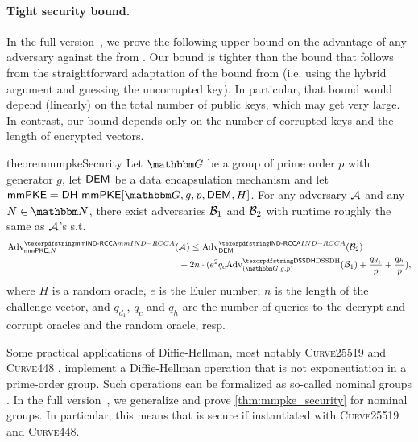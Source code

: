 \paragraph{Tight security bound.}
In the full version~\cite{EPRINT:AHKM21}, we prove the following upper bound on the advantage of any adversary against the \mmPKE from \cite{ASIACCS:PinPoeSch14}. Our bound is tighter than the bound that follows from the straightforward adaptation of the bound from \cite{ASIACCS:PinPoeSch14} (i.e. using the hybrid argument and guessing the uncorrupted key). In particular, that bound would depend (linearly) on the total number of public keys, which may get very large. In contrast, our bound depends only on the number of corrupted keys and the length of encrypted vectors.

\begin{restatable}{theorem}{mmpkeSecurity}\label{thm:mmpke_security}
  Let $\Grp$ be a group of prime order $p$ with generator $g$, let $\dem$ be a data encapsulation mechanism and let
  $\mmPKE = \dhmmpke[\Grp, g, p, \dem, H]$. For any adversary $\Adv$ and any $N \in \N$, there exist adversaries $\Bdv[1]$ and $\Bdv[2]$ with runtime roughly the same as $\Adv$'s s.t.
  \begin{align*}
    \textnormal{Adv}^{\mmindrcca}_{\mmPKE, N}(& \Adv) \leq \adv{\indrcca}{\dem}({\Bdv[2]}) \\
                                              &+2n\cdot(e^2q_c \adv{\sdh}{(\Grp, g, p)}({\Bdv[1]}) + \frac{q_{d_1}}{p} + \frac{q_{h}}{p}),
  \end{align*}
  where $H$ is a random oracle, $e$
  is the Euler number, $n$ is the length of the challenge vector, and $q_{d_1}$, $q_c$ and $q_h$ are the number of queries to the decrypt and corrupt oracles and the random oracle, resp.
\end{restatable}

\begin{remark}
Some practical applications of Diffie-Hellman, most notably \textsc{Curve25519} and \textsc{Curve448} \cite{rfc7748},
implement a Diffie-Hellman operation that is not exponentiation in a prime-order group. Such operations can be
formalized as so-called nominal groups \cite{EC:ABHKLR21_2}. In the full version~\cite{EPRINT:AHKM21}, we generalize and prove \cref{thm:mmpke_security} for nominal groups. In particular, this means that \dhmmpke is secure if instantiated with \textsc{Curve25519} and \textsc{Curve448}.
\end{remark}


